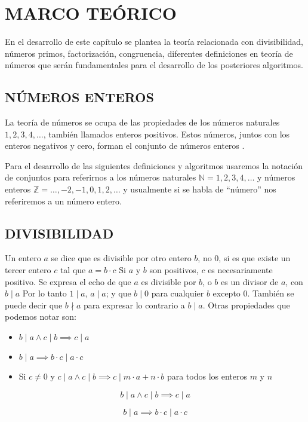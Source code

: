 \clearpage
\chapter{MARCO TEÓRICO}
En el desarrollo de este capítulo se plantea la teoría relacionada con divisibilidad, números primos, factorización, congruencia, diferentes definiciones en teoría de números que serán fundamentales para el desarrollo de los posteriores algoritmos.
    
    \section{NÚMEROS ENTEROS}
    La teoría de números se ocupa de las propiedades de los números naturales $1, 2, 3, 4, \dots$, también llamados enteros positivos. Estos números, juntos con los enteros negativos y cero, forman el conjunto de números enteros \citep{NZM1991}.

    Para el desarrollo de las siguientes definiciones y algoritmos usaremos la notación de conjuntos para referirnos a los números naturales $ \mathbb{N} = {1, 2, 3,4, \dots}$ y números enteros $ \mathbb{Z} = \dots, -2, -1, 0, 1, 2, \dots$ y usualmente si se habla de “número” nos referiremos a un número entero.

    \section{DIVISIBILIDAD}
    Un entero $a$ se dice que es divisible por otro entero $b$, no $0$, si es que existe un tercer entero $c$ tal que $a=b\cdot c$
    Si $a$ y $b$ son positivos, $c$ es necesariamente positivo. Se expresa el echo de que $a$ es divisible por $b$, o $b$ es un divisor de $a$, con $b \mid a$
    Por lo tanto $1 \mid a$, $a \mid a$; y que $b \mid 0$ para cualquier $b$ excepto 0. También se puede decir que $b \nmid a$ para expresar lo contrario a $b \mid a$.
    Otras propiedades que podemos notar son:
    \begin{itemize}
        \item{$b \mid a \land c \mid b \implies c \mid a$}
        \item{$b \mid a \implies b\cdot c \mid a\cdot c$}
        \item{Si $c\not = 0$ y $c \mid a \land c \mid b \implies c\mid m\cdot a + n\cdot b$ para todos los enteros $m$ y $n$ }
    \end{itemize}
    \[
        b \mid a \land c \mid b \implies c \mid a
    \]

    \[
        b \mid a \implies b\cdot c \mid a\cdot c
    \]
    
